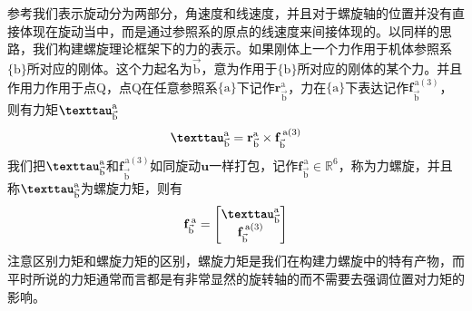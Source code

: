 \documentclass[12pt, a4paper, article, UTF8]{ctexart}
\begin{document}
参考我们表示旋动分为两部分，角速度和线速度，并且对于螺旋轴的位置并没有直接体现在旋动当中，而是通过参照系的原点的线速度来间接体现的。以同样的思路，我们构建螺旋理论框架下的力的表示。如果刚体上一个力作用于机体参照系$\{\text{b}\}$所对应的刚体。这个力起名为$\vec{\text{b}}$，意为作用于$\{\text{b}\}$所对应的刚体的某个力。并且作用力作用于点Q，点Q在任意参照系$\{\text{a}\}$下记作$\mathbf{r}^\text{a}_{\vec{\text{b}}}$，力在$\{\text{a}\}$下表达记作$\mathbf{f}^{\,\text{a}(3)}_{\vec{\text{b}}}$，则有力矩$\textbf{\texttau}_{\vec{\text{b}}}^\text{a}$
\begin{align}
\textbf{\texttau}_{\vec{\text{b}}}^\text{a} = \mathbf{r}^\text{a}_{\vec{\text{b}}} \times \mathbf{f}^{\,\text{a}(3)}_{\vec{\text{b}}}
\end{align}
我们把$\textbf{\texttau}_{\vec{\text{b}}}^\text{a}$和$\mathbf{f}^{\,\text{a}(3)}_{\vec{\text{b}}}$如同旋动$\mathbf{u}$一样打包，记作$\mathbf{f}_{\vec{\text{b}}}^{\,\text{a}}\in\mathbb{R}^6$，称为力螺旋，并且称$\textbf{\texttau}^{\text{a}}_{\vec{\text{b}}}$为螺旋力矩，则有
\begin{align}
\mathbf{f}_{\vec{\text{b}}}^{\,\text{a}} = \begin{bmatrix}
\textbf{\texttau}_{\vec{\text{b}}}^\text{a} \\  \mathbf{f}^{\,\text{a}(3)}_{\vec{\text{b}}}
\end{bmatrix} \label{eq:wrenchdef}
\end{align}
注意区别力矩和螺旋力矩的区别，螺旋力矩是我们在构建力螺旋中的特有产物，而平时所说的力矩通常而言都是有非常显然的旋转轴的而不需要去强调位置对力矩的影响。
\end{document}
